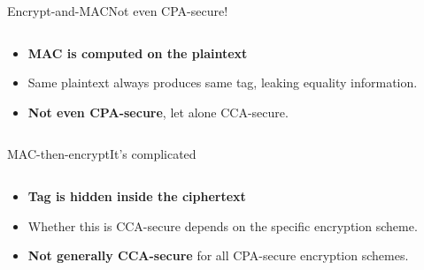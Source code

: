\documentclass[aspectratio=169, lualatex, handout]{beamer}
\begin{document}
\begin{frame}{Encrypt-and-MAC}{Not even CPA-secure!}
	\begin{columns}[c]
		\begin{column}{0.5\textwidth}
			\begin{itemize}[<+->]
				\item \textbf{MAC is computed on the plaintext}
				\item Same plaintext always produces same tag, leaking equality information.
				\item \textbf{Not even CPA-secure}, let alone CCA-secure.
			\end{itemize}
		\end{column}
		\begin{column}{0.5\textwidth}
		\end{column}
	\end{columns}
\end{frame}

\begin{frame}{MAC-then-encrypt}{It's complicated}
	\begin{columns}[c]
		\begin{column}{0.5\textwidth}
			\begin{itemize}[<+->]
				\item \textbf{Tag is hidden inside the ciphertext}
				\item Whether this is CCA-secure depends on the specific encryption scheme.
				\item \textbf{Not generally CCA-secure} for all CPA-secure encryption schemes.
			\end{itemize}
		\end{column}
		\begin{column}{0.5\textwidth}
		\end{column}
	\end{columns}
\end{frame}
\end{document}

